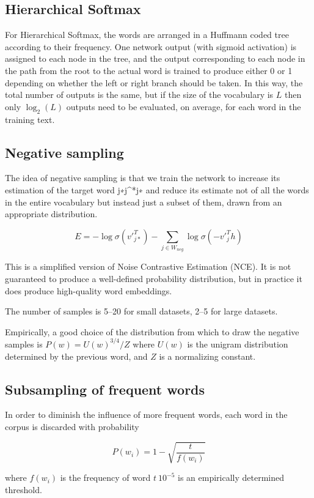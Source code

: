 \documentclass[11pt]{article}
\begin{document}
\subsection{Hierarchical Softmax}\label{subsec:hierarchical-softmax}
For Hierarchical Softmax, the words are arranged in a Huffmann coded tree according to their frequency.
One network output (with sigmoid activation) is assigned to each node in the tree, and the output corresponding to each node in the path from the root to the actual word is trained to produce either 0 or 1 depending on whether the left or right branch should be taken.
In this way, the total number of outputs is the same, but if the size of the vocabulary is $L$ then only $\log_2(L)$ outputs need to be evaluated, on average, for each word in the training text.

\subsection{Negative sampling}\label{subsec:negative-sampling}
The idea of negative sampling is that we train the network to increase its estimation of the target word j∗j^*j∗ and reduce its estimate not of all the words in the entire vocabulary but instead just a subset of them, drawn from an appropriate distribution.

\[E = -\log \sigma(v'_{j*}^T) - \sum_{j \in W_{neg}} \log \sigma (-v'_{j}^{T}h)\]

This is a simplified version of Noise Contrastive Estimation (NCE).
It is not guaranteed to produce a well-defined probability distribution, but in practice it does produce high-quality word embeddings.

The number of samples is 5--20 for small datasets, 2--5 for large datasets.

Empirically, a good choice of the distribution from which to draw the negative samples is $P(w) = U(w)^{3/4} / Z$ where $U(w)$ is the unigram distribution determined by the previous word, and $Z$ is a normalizing constant.

\subsection{Subsampling of frequent words}\label{subsec:subsampling-of-frequent-words}
In order to diminish the influence of more frequent words, each word in the corpus is discarded with probability

\[P(w_i) = 1 - \sqrt{\dfrac{t}{f(w_i)}}\]

where $f(w_i)$ is the frequency of word $t ~ 10^{-5}$ is an empirically determined threshold.
\end{document}
